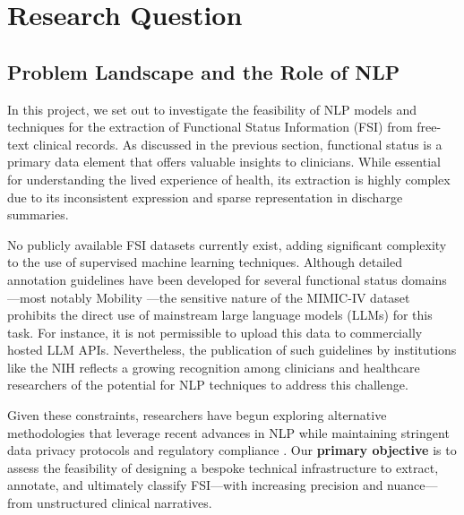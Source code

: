 
\chapter{Research Question}
\section{Problem Landscape and the Role of NLP}

In this project, we set out to investigate the feasibility of NLP models and techniques for the extraction of Functional Status Information (FSI) from free-text clinical records. As discussed in the previous section, functional status is a primary data element that offers valuable insights to clinicians. While essential for understanding the lived experience of health, its extraction is highly complex due to its inconsistent expression and sparse representation in discharge summaries. \medskip

No publicly available FSI datasets currently exist, adding significant complexity to the use of supervised machine learning techniques. Although detailed annotation guidelines have been developed for several functional status domains—most notably Mobility \cite{nih_mobility_guideline}—the sensitive nature of the MIMIC-IV dataset prohibits the direct use of mainstream large language models (LLMs) for this task. For instance, it is not permissible to upload this data to commercially hosted LLM APIs. Nevertheless, the publication of such guidelines by institutions like the NIH reflects a growing recognition among clinicians and healthcare researchers of the potential for NLP techniques to address this challenge.\medskip

Given these constraints, researchers have begun exploring alternative methodologies that leverage recent advances in NLP while maintaining stringent data privacy protocols and regulatory compliance \cite{kumar2024gpt}. Our \textbf{primary objective} is to assess the feasibility of designing a bespoke technical infrastructure to extract, annotate, and ultimately classify FSI—with increasing precision and nuance—from unstructured clinical narratives.


